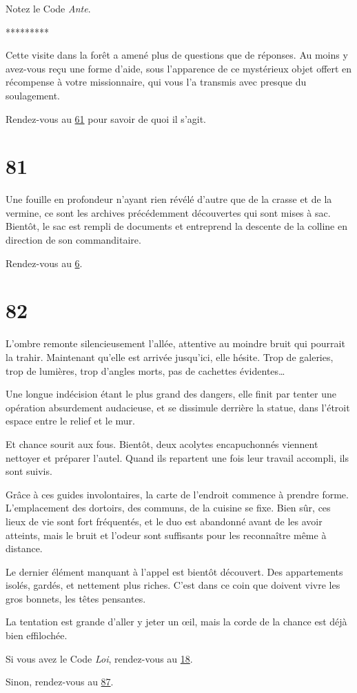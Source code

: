 \documentclass{report}
\newcommand{\gsection}[1]{
    \section{#1}
    \label{section-#1}
}
\newcommand{\glink}[1]{\hyperref[section-#1]{#1}}
\newcommand{\ellipse}{
    \begin{center}
        *********
    \end{center}
}
\begin{document}
Notez le Code \emph{Ante}.

\ellipse

Cette visite dans la forêt a amené plus de questions que de réponses. Au moins y avez-vous reçu une forme d'aide, sous l'apparence de ce mystérieux objet offert en récompense à votre missionnaire, qui vous l'a transmis avec presque du soulagement.

Rendez-vous au \glink{61} pour savoir de quoi il s'agit.

\gsection{81}

Une fouille en profondeur n'ayant rien révélé d'autre que de la crasse et de la vermine, ce sont les archives précédemment découvertes qui sont mises à sac. Bientôt, le sac est rempli de documents et entreprend la descente de la colline en direction de son commanditaire.

Rendez-vous au \glink{6}.

\gsection{82}

L'ombre remonte silencieusement l'allée, attentive au moindre bruit qui pourrait la trahir. Maintenant qu'elle est arrivée jusqu'ici, elle hésite. Trop de galeries, trop de lumières, trop d'angles morts, pas de cachettes évidentes\dots

Une longue indécision étant le plus grand des dangers, elle finit par tenter une opération absurdement audacieuse, et se dissimule derrière la statue, dans l'étroit espace entre le relief et le mur.

Et chance sourit aux fous. Bientôt, deux acolytes encapuchonnés viennent nettoyer et préparer l'autel. Quand ils repartent une fois leur travail accompli, ils sont suivis.

Grâce à ces guides involontaires, la carte de l'endroit commence à prendre forme. L'emplacement des dortoirs, des communs, de la cuisine se fixe. Bien sûr, ces lieux de vie sont fort fréquentés, et le duo est abandonné avant de les avoir atteints, mais le bruit et l'odeur sont suffisants pour les reconnaître même à distance.

Le dernier élément manquant à l'appel est bientôt découvert. Des appartements isolés, gardés, et nettement plus riches. C'est dans ce coin que doivent vivre les gros bonnets, les têtes pensantes.

La tentation est grande d'aller y jeter un œil, mais la corde de la chance est déjà bien effilochée. 

Si vous avez le Code \emph{Loi}, rendez-vous au \glink{18}.

Sinon, rendez-vous au \glink{87}.
\end{document}
